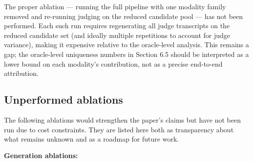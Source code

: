 \documentclass[11pt]{article}
\begin{document}
The proper ablation --- running the full pipeline with one modality
family removed and re-running judging on the reduced candidate pool ---
has not been performed. Each such run requires regenerating all judge
transcripts on the reduced candidate set (and ideally multiple
repetitions to account for judge variance), making it expensive relative
to the oracle-level analysis. This remains a gap; the oracle-level
uniqueness numbers in Section 6.5 should be interpreted as a lower bound
on each modality's contribution, not as a precise end-to-end
attribution.

\hypertarget{unperformed-ablations}{%
\subsection{Unperformed ablations}\label{unperformed-ablations}}

The following ablations would strengthen the paper's claims but have not
been run due to cost constraints. They are listed here both as
transparency about what remains unknown and as a roadmap for future
work.

\textbf{Generation ablations:}
\end{document}
